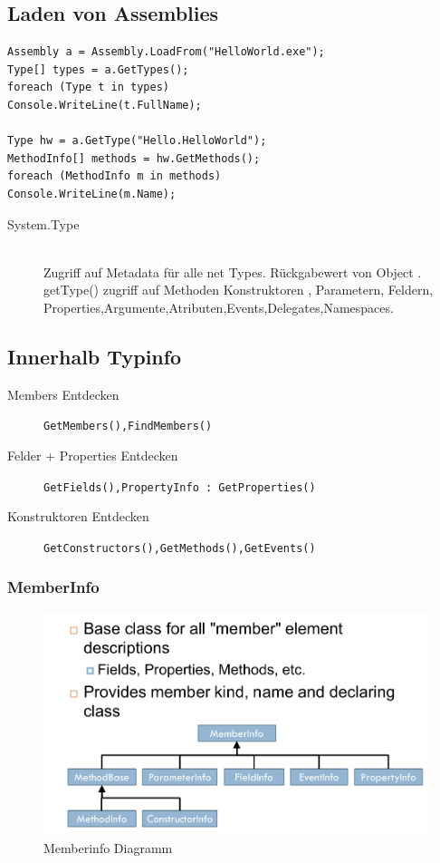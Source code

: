 \documentclass[a4paper,10pt]{scrartcl}
\begin{document}
\subsection{Laden von Assemblies}
\begin{lstlisting}[caption=Laden von Assemblies]
 Assembly a = Assembly.LoadFrom("HelloWorld.exe");
Type[] types = a.GetTypes();
foreach (Type t in types)
Console.WriteLine(t.FullName);

Type hw = a.GetType("Hello.HelloWorld");
MethodInfo[] methods = hw.GetMethods();
foreach (MethodInfo m in methods)
Console.WriteLine(m.Name);

\end{lstlisting}
\begin{description}
 \item [System.Type] \hfill \\
 \subitem Zugriff auf Metadata für alle net Types.
 \subitem Rückgabewert von Object . getType()
 \subitem zugriff auf Methoden Konstruktoren , Parametern, Feldern, Properties,Argumente,Atributen,Events,Delegates,Namespaces.
\end{description}

\subsection{Innerhalb Typinfo}
\begin{description}
 \item [Members Entdecken]
 \subitem [MemberInfo] \texttt{GetMembers(),FindMembers()}
 \item [Felder + Properties Entdecken]
 \subitem [MemberInfo] \texttt{GetFields(),PropertyInfo : GetProperties()}
 \item [Konstruktoren Entdecken]
 \subitem \texttt{GetConstructors(),GetMethods(),GetEvents()}
\end{description}

\subsubsection{MemberInfo}
\begin{figure}[h]
 \centering
 \includegraphics[scale=0.5]{./reflection2.png}
 \caption{Memberinfo Diagramm}
\end{figure}
\end{document}
